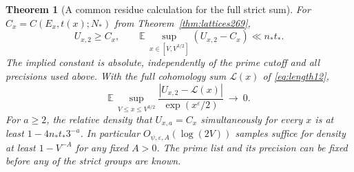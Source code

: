 \documentclass[a4paper,11pt]{article}
\newtheorem{theorem}[proposition]{Theorem}
\theoremstyle{definition}
\theoremstyle{remark}
\numberwithin{equation}{section}
\begin{document}
\begin{theorem}[A common residue calculation for the full strict sum]\leavevmode
\label{thm:average269}
For \(C_x=C(E_x,t(x);N_*)\) from Theorem~\ref{thm:lattices269},
\[
 U_{x,2}\ge C_x,\qquad
 \mathbb E\,\sup_{x\in[V,V^{3/2}]}(U_{x,2}-C_x)
             \ll n_*t_* .
\]
The implied constant is absolute, independently of the prime
cutoff and all precisions used above. With the full cohomology
sum \(\mathcal L(x)\) of \eqref{eq:length12},
\[
 \mathbb E\,\sup_{V\le x\le V^{3/2}}
  \frac{|U_{x,2}-\mathcal L(x)|}{\exp(x^\varepsilon/2)}
                 \ \longrightarrow\ 0 .
\]
For \(a\ge2\), the relative density that
\(U_{x,a}=C_x\) simultaneously for every \(x\) is at least
\(1-4n_*t_*3^{-a}\). In particular \(O_{\psi,\varepsilon,A}
(\log(2V))\) samples suffice for density at least \(1-V^{-A}\)
for any fixed \(A>0\). The prime list and its precision can
be fixed before any of the strict groups are known.
\end{theorem}
\end{document}
